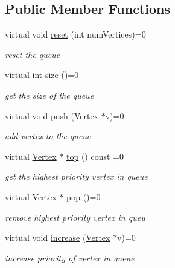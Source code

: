 \subsection*{Public Member Functions}
\begin{DoxyCompactItemize}
\item 
virtual void \hyperlink{class_graph_queue_ae29f8312580139ff26acc47b185ef946}{reset} (int num\+Vertices)=0
\begin{DoxyCompactList}\small\item\em reset the queue \end{DoxyCompactList}\item 
virtual int \hyperlink{class_graph_queue_a3fc6e39f16b7d44cd4a2e7d10f320eb8}{size} ()=0
\begin{DoxyCompactList}\small\item\em get the size of the queue \end{DoxyCompactList}\item 
virtual void \hyperlink{class_graph_queue_a613b3e0e0f4efe16abfc7c1e4c9ebe2a}{push} (\hyperlink{class_vertex}{Vertex} $\ast$v)=0
\begin{DoxyCompactList}\small\item\em add vertex to the queue \end{DoxyCompactList}\item 
virtual \hyperlink{class_vertex}{Vertex} $\ast$ \hyperlink{class_graph_queue_a81b7e172ff17a06ce84a679ff80b6a16}{top} () const =0
\begin{DoxyCompactList}\small\item\em get the highest priority vertex in queue \end{DoxyCompactList}\item 
virtual \hyperlink{class_vertex}{Vertex} $\ast$ \hyperlink{class_graph_queue_a6b6b42957573d03686dbaaa14893b9d4}{pop} ()=0
\begin{DoxyCompactList}\small\item\em remove highest priority vertex in queu \end{DoxyCompactList}\item 
virtual void \hyperlink{class_graph_queue_ae6bace12508bbbbd86a594a2ca8b9e30}{increase} (\hyperlink{class_vertex}{Vertex} $\ast$v)=0
\begin{DoxyCompactList}\small\item\em increase priority of vertex in queue \end{DoxyCompactList}\end{DoxyCompactItemize}


